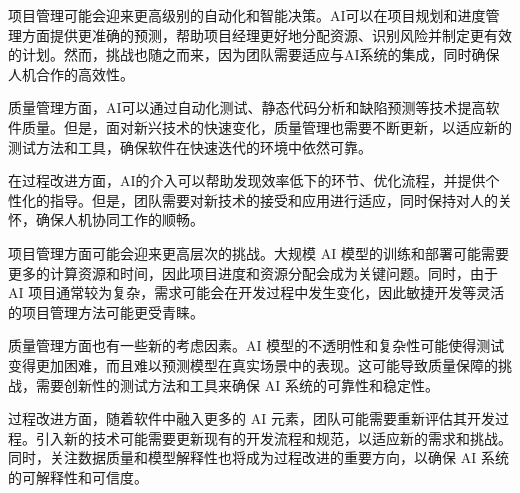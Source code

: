 \begin{solution}
项目管理可能会迎来更高级别的自动化和智能决策。AI可以在项目规划和进度管理方面提供更准确的预测，帮助项目经理更好地分配资源、识别风险并制定更有效的计划。然而，挑战也随之而来，因为团队需要适应与AI系统的集成，同时确保人机合作的高效性。

质量管理方面，AI可以通过自动化测试、静态代码分析和缺陷预测等技术提高软件质量。但是，面对新兴技术的快速变化，质量管理也需要不断更新，以适应新的测试方法和工具，确保软件在快速迭代的环境中依然可靠。

在过程改进方面，AI的介入可以帮助发现效率低下的环节、优化流程，并提供个性化的指导。但是，团队需要对新技术的接受和应用进行适应，同时保持对人的关怀，确保人机协同工作的顺畅。

\vspace{2em}

项目管理方面可能会迎来更高层次的挑战。大规模 AI 模型的训练和部署可能需要更多的计算资源和时间，因此项目进度和资源分配会成为关键问题。同时，由于 AI 项目通常较为复杂，需求可能会在开发过程中发生变化，因此敏捷开发等灵活的项目管理方法可能更受青睐。

质量管理方面也有一些新的考虑因素。AI 模型的不透明性和复杂性可能使得测试变得更加困难，而且难以预测模型在真实场景中的表现。这可能导致质量保障的挑战，需要创新性的测试方法和工具来确保 AI 系统的可靠性和稳定性。
    
过程改进方面，随着软件中融入更多的 AI 元素，团队可能需要重新评估其开发过程。引入新的技术可能需要更新现有的开发流程和规范，以适应新的需求和挑战。同时，关注数据质量和模型解释性也将成为过程改进的重要方向，以确保 AI 系统的可解释性和可信度。
\end{solution}
